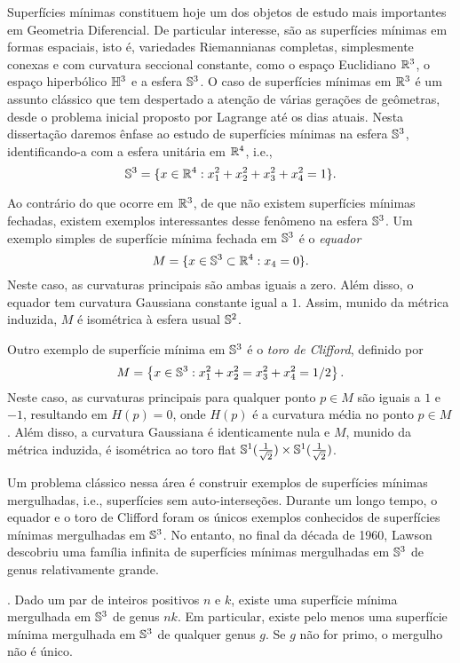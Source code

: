 Superf\'icies m\'inimas constituem hoje um dos objetos de estudo
mais importantes em Geometria Diferencial. De particular interesse, 
s\~ao as superf\'icies m\'inimas em formas espaciais, isto é, variedades Riemannianas completas, simplesmente conexas e com curvatura seccional constante, 
como o espa\c co Euclidiano $\mathbb{R}^3$, o espa\c co hiperb\'olico $\mathbb{H}^3$
e a esfera $\mathbb{S}^3$. O caso de superf\'icies m\'inimas em $\mathbb{R}^3$ \'e um
assunto cl\'assico que tem despertado a aten\c c\~ao de v\'arias 
gera\c c\~oes de ge\^ometras, desde o problema inicial proposto por 
Lagrange at\'e os dias atuais. Nesta disserta\c c\~ao daremos
\^enfase ao estudo de superf\'icies m\'inimas na esfera $\mathbb{S}^3$, 
identificando-a com a esfera unit\'aria em $\mathbb{R}^4$, i.e.,
\[
\mathbb{S}^3=\{x\in\mathbb{R}^4:x_1^2+x_2^2+x_3^2+x_4^2=1\}.
\]



Ao contr\'ario do que ocorre em $\mathbb{R}^3$, de que n\~ao existem 
superf\'icies m\'inimas fechadas, existem exemplos interessantes
desse fen\^omeno na esfera $\mathbb{S}^3$. Um exemplo simples de 
superf\'icie m\'inima fechada em $\mathbb{S}^3$ \'e o {\em equador}
\[
M=\{x\in\mathbb{S}^3\subset\mathbb{R}^4:x_4=0\}.
\]
Neste caso, as curvaturas principais s\~ao ambas iguais a zero. 
Al\'em disso, o equador tem curvatura Gaussiana
constante igual a $1$. Assim, munido da m\'etrica induzida, $M$ \'e
isom\'etrica \`a esfera usual $\mathbb{S}^2$.

Outro exemplo de superf\'icie m\'inima em $\mathbb{S}^3$ \'e o {\em toro de
	Clifford}, definido por
\[
M=\left\{x\in\mathbb{S}^3:x_1^2+x_2^2=x_3^2+x_4^2=1/2\right\}.
\]
Neste caso, as curvaturas principais para qualquer ponto $p \in M$ s\~ao iguais a $1$ e $-1$, 
resultando em $H(p)=0$, onde $H(p)$ é a curvatura média no ponto $p \in M$. Al\'em disso, a curvatura Gaussiana \'e 
identicamente nula e $M$, munido da m\'etrica induzida, \'e 
isom\'etrica ao toro flat 
$\mathbb{S}^1(\frac{1}{\sqrt2})\times\mathbb{S}^1(\frac{1}{\sqrt2})$.

Um problema cl\'assico nessa \'area \'e construir exemplos
de superf\'icies m\'inimas mergulhadas, i.e., superf\'icies sem 
auto-interse\c c\~oes. Durante um longo tempo, o equador e 
o toro de Clifford foram os \'unicos exemplos conhecidos de 
superf\'icies m\'inimas mergulhadas em $\mathbb{S}^3$. No entanto, 
no final da d\'ecada de 1960, Lawson \cite{Lawson1970} 
descobriu uma fam\'ilia infinita de superf\'icies m\'inimas 
mergulhadas em $\mathbb{S}^3$ de genus relativamente grande.

\begin{teorema}\label{teo:lawson}
	\cite{Lawson1970}. Dado um par de inteiros positivos $n$ e $k$, existe uma superf\'icie
	m\'inima mergulhada em $\mathbb{S}^3$ de genus $nk$. Em particular, 
	existe pelo menos uma superf\'icie m\'inima mergulhada em $\mathbb{S}^3$
	de qualquer genus $g$. Se $g$ não for primo, o mergulho não é único.
\end{teorema}

